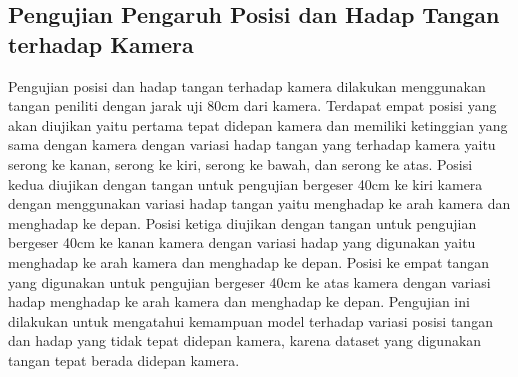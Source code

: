 \subsection{Pengujian Pengaruh Posisi dan Hadap Tangan terhadap Kamera}
\label{sub:posisidansudut}
Pengujian posisi dan hadap tangan terhadap kamera dilakukan menggunakan tangan peniliti dengan jarak uji 80cm dari kamera. Terdapat empat posisi yang akan diujikan yaitu pertama tepat didepan kamera dan memiliki ketinggian yang sama dengan kamera dengan variasi hadap tangan yang terhadap kamera yaitu serong ke kanan, serong ke kiri, serong ke bawah, dan serong ke atas. Posisi kedua diujikan dengan tangan untuk pengujian bergeser 40cm ke kiri kamera dengan menggunakan variasi hadap tangan yaitu menghadap ke arah kamera dan menghadap ke depan. Posisi ketiga diujikan dengan tangan untuk pengujian bergeser 40cm ke kanan kamera dengan variasi hadap yang digunakan yaitu menghadap ke arah kamera dan menghadap ke depan. Posisi ke empat tangan yang digunakan untuk pengujian bergeser 40cm ke atas kamera dengan variasi hadap menghadap ke arah kamera dan menghadap ke depan. Pengujian ini dilakukan untuk mengatahui kemampuan model terhadap variasi posisi tangan dan hadap yang tidak tepat didepan kamera, karena dataset yang digunakan tangan tepat berada didepan kamera.

